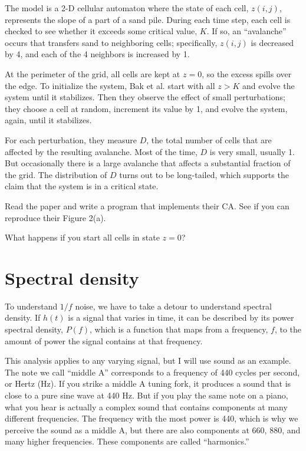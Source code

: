 \documentclass[10pt]{book}
\begin{document}
The model is a 2-D cellular automaton where the state of each cell,
$z(i,j)$, represents the slope of a part of a sand pile.  During each
time step, each cell is checked to see whether it exceeds some
critical value, $K$.  If so, an ``avalanche'' occurs that transfers
sand to neighboring cells; specifically, $z(i,j)$ is decreased by 4,
and each of the 4 neighbors is increased by 1.

At the perimeter of the grid, all cells are kept at $z=0$, so
the excess spills over the edge.  To initialize the system,
Bak et al. start with all $z > K$ and evolve the system until
it stabilizes.  Then they observe the effect of small perturbations;
they choose a cell at random, increment its value
by 1, and evolve the system, again, until it stabilizes.

For each perturbation, they measure $D$, the total number
of cells that are affected by the resulting avalanche.  Most of
the time, $D$ is very small, usually 1.  But occasionally
there is a large avalanche that affects a substantial fraction
of the grid.  The distribution of $D$ turns out to be long-tailed,
which supports the claim that the system is in a critical state.

\begin{ex}

Read the paper and write a program that implements their CA.
See if you can reproduce their Figure 2(a).

What happens if you start all cells in state $z=0$?

\end{ex}


\section{Spectral density}

To understand $1/f$ noise, we have to take a detour to understand
spectral density.  If $h(t)$ is a signal that varies in time, it can
be described by its power spectral density, $P(f)$, which is a
function that maps from a frequency, $f$, to the amount of power the
signal contains at that frequency.

This analysis applies to any varying signal, but I will use sound as
an example.  The note we call ``middle A'' corresponds to a frequency
of 440 cycles per second, or Hertz (Hz).  If you strike a middle A
tuning fork, it produces a sound that is close to a pure sine wave at
440 Hz.  But if you play the same note on a piano, what you hear is
actually a complex sound that contains components at many different
frequencies.  The frequency with the most power is 440, which is why
we perceive the sound as a middle A, but there are also components at
660, 880, and many higher frequencies.  These components are called
``harmonics.''
\end{document}
